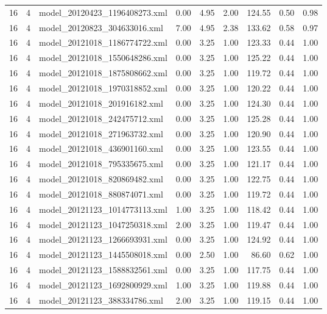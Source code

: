 \begin{table}[ht]
\begin{tabular}{rrlrrrrrr}
   16 &   4 & model\_20120423\_1196408273.xml & 0.00 & 4.95 & 2.00 & 124.55 & 0.50 & 0.98 \\ 
   16 &   4 & model\_20120823\_304633016.xml & 7.00 & 4.95 & 2.38 & 133.62 & 0.58 & 0.97 \\ 
   16 &   4 & model\_20121018\_1186774722.xml & 0.00 & 3.25 & 1.00 & 123.33 & 0.44 & 1.00 \\ 
   16 &   4 & model\_20121018\_1550648286.xml & 0.00 & 3.25 & 1.00 & 125.22 & 0.44 & 1.00 \\ 
   16 &   4 & model\_20121018\_1875808662.xml & 0.00 & 3.25 & 1.00 & 119.72 & 0.44 & 1.00 \\ 
   16 &   4 & model\_20121018\_1970318852.xml & 0.00 & 3.25 & 1.00 & 120.22 & 0.44 & 1.00 \\ 
   16 &   4 & model\_20121018\_201916182.xml & 0.00 & 3.25 & 1.00 & 124.30 & 0.44 & 1.00 \\ 
   16 &   4 & model\_20121018\_242475712.xml & 0.00 & 3.25 & 1.00 & 125.28 & 0.44 & 1.00 \\ 
   16 &   4 & model\_20121018\_271963732.xml & 0.00 & 3.25 & 1.00 & 120.90 & 0.44 & 1.00 \\ 
   16 &   4 & model\_20121018\_436901160.xml & 0.00 & 3.25 & 1.00 & 123.55 & 0.44 & 1.00 \\ 
   16 &   4 & model\_20121018\_795335675.xml & 0.00 & 3.25 & 1.00 & 121.17 & 0.44 & 1.00 \\ 
   16 &   4 & model\_20121018\_820869482.xml & 0.00 & 3.25 & 1.00 & 122.75 & 0.44 & 1.00 \\ 
   16 &   4 & model\_20121018\_880874071.xml & 0.00 & 3.25 & 1.00 & 119.72 & 0.44 & 1.00 \\ 
   16 &   4 & model\_20121123\_1014773113.xml & 1.00 & 3.25 & 1.00 & 118.42 & 0.44 & 1.00 \\ 
   16 &   4 & model\_20121123\_1047250318.xml & 2.00 & 3.25 & 1.00 & 119.47 & 0.44 & 1.00 \\ 
   16 &   4 & model\_20121123\_1266693931.xml & 0.00 & 3.25 & 1.00 & 124.92 & 0.44 & 1.00 \\ 
   16 &   4 & model\_20121123\_1445508018.xml & 0.00 & 2.50 & 1.00 & 86.60 & 0.62 & 1.00 \\ 
   16 &   4 & model\_20121123\_1588832561.xml & 0.00 & 3.25 & 1.00 & 117.75 & 0.44 & 1.00 \\ 
   16 &   4 & model\_20121123\_1692800929.xml & 1.00 & 3.25 & 1.00 & 119.88 & 0.44 & 1.00 \\ 
   16 &   4 & model\_20121123\_388334786.xml & 2.00 & 3.25 & 1.00 & 119.15 & 0.44 & 1.00 \\ 

\end{tabular}
\end{table}

